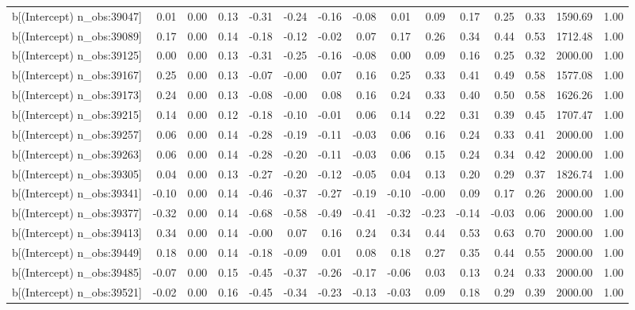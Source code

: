 \begin{table}[ht]
\begin{tabular}{rrrrrrrrrrrrrrr}
  b[(Intercept) n\_obs:39047] & 0.01 & 0.00 & 0.13 & -0.31 & -0.24 & -0.16 & -0.08 & 0.01 & 0.09 & 0.17 & 0.25 & 0.33 & 1590.69 & 1.00 \\ 
  b[(Intercept) n\_obs:39089] & 0.17 & 0.00 & 0.14 & -0.18 & -0.12 & -0.02 & 0.07 & 0.17 & 0.26 & 0.34 & 0.44 & 0.53 & 1712.48 & 1.00 \\ 
  b[(Intercept) n\_obs:39125] & 0.00 & 0.00 & 0.13 & -0.31 & -0.25 & -0.16 & -0.08 & 0.00 & 0.09 & 0.16 & 0.25 & 0.32 & 2000.00 & 1.00 \\ 
  b[(Intercept) n\_obs:39167] & 0.25 & 0.00 & 0.13 & -0.07 & -0.00 & 0.07 & 0.16 & 0.25 & 0.33 & 0.41 & 0.49 & 0.58 & 1577.08 & 1.00 \\ 
  b[(Intercept) n\_obs:39173] & 0.24 & 0.00 & 0.13 & -0.08 & -0.00 & 0.08 & 0.16 & 0.24 & 0.33 & 0.40 & 0.50 & 0.58 & 1626.26 & 1.00 \\ 
  b[(Intercept) n\_obs:39215] & 0.14 & 0.00 & 0.12 & -0.18 & -0.10 & -0.01 & 0.06 & 0.14 & 0.22 & 0.31 & 0.39 & 0.45 & 1707.47 & 1.00 \\ 
  b[(Intercept) n\_obs:39257] & 0.06 & 0.00 & 0.14 & -0.28 & -0.19 & -0.11 & -0.03 & 0.06 & 0.16 & 0.24 & 0.33 & 0.41 & 2000.00 & 1.00 \\ 
  b[(Intercept) n\_obs:39263] & 0.06 & 0.00 & 0.14 & -0.28 & -0.20 & -0.11 & -0.03 & 0.06 & 0.15 & 0.24 & 0.34 & 0.42 & 2000.00 & 1.00 \\ 
  b[(Intercept) n\_obs:39305] & 0.04 & 0.00 & 0.13 & -0.27 & -0.20 & -0.12 & -0.05 & 0.04 & 0.13 & 0.20 & 0.29 & 0.37 & 1826.74 & 1.00 \\ 
  b[(Intercept) n\_obs:39341] & -0.10 & 0.00 & 0.14 & -0.46 & -0.37 & -0.27 & -0.19 & -0.10 & -0.00 & 0.09 & 0.17 & 0.26 & 2000.00 & 1.00 \\ 
  b[(Intercept) n\_obs:39377] & -0.32 & 0.00 & 0.14 & -0.68 & -0.58 & -0.49 & -0.41 & -0.32 & -0.23 & -0.14 & -0.03 & 0.06 & 2000.00 & 1.00 \\ 
  b[(Intercept) n\_obs:39413] & 0.34 & 0.00 & 0.14 & -0.00 & 0.07 & 0.16 & 0.24 & 0.34 & 0.44 & 0.53 & 0.63 & 0.70 & 2000.00 & 1.00 \\ 
  b[(Intercept) n\_obs:39449] & 0.18 & 0.00 & 0.14 & -0.18 & -0.09 & 0.01 & 0.08 & 0.18 & 0.27 & 0.35 & 0.44 & 0.55 & 2000.00 & 1.00 \\ 
  b[(Intercept) n\_obs:39485] & -0.07 & 0.00 & 0.15 & -0.45 & -0.37 & -0.26 & -0.17 & -0.06 & 0.03 & 0.13 & 0.24 & 0.33 & 2000.00 & 1.00 \\ 
  b[(Intercept) n\_obs:39521] & -0.02 & 0.00 & 0.16 & -0.45 & -0.34 & -0.23 & -0.13 & -0.03 & 0.09 & 0.18 & 0.29 & 0.39 & 2000.00 & 1.00 \\ 

\end{tabular}
\end{table}
